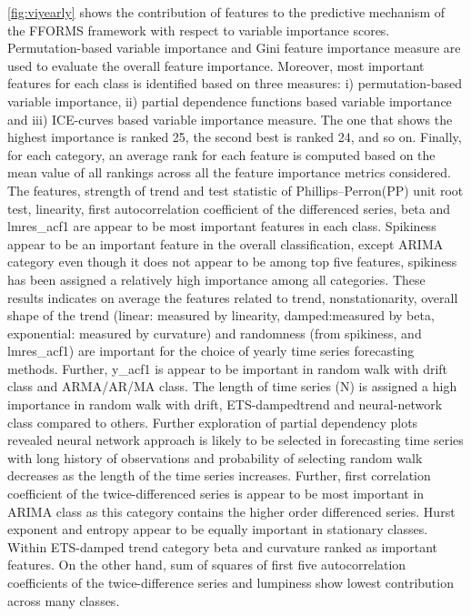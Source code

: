 \documentclass[11pt,a4paper,]{article}
\begin{document}
\autoref{fig:viyearly} shows the contribution of features to the
predictive mechanism of the FFORMS framework with respect to variable
importance scores. Permutation-based variable importance and Gini
feature importance measure are used to evaluate the overall feature
importance. Moreover, most important features for each class is
identified based on three measures: i) permutation-based variable
importance, ii) partial dependence functions based variable importance
and iii) ICE-curves based variable importance measure. The one that
shows the highest importance is ranked 25, the second best is ranked 24,
and so on. Finally, for each category, an average rank for each feature
is computed based on the mean value of all rankings across all the
feature importance metrics considered. The features, strength of trend
and test statistic of Phillips--Perron(PP) unit root test, linearity,
first autocorrelation coefficient of the differenced series, beta and
lmres\_acf1 are appear to be most important features in each class.
Spikiness appear to be an important feature in the overall
classification, except ARIMA category even though it does not appear to
be among top five features, spikiness has been assigned a relatively
high importance among all categories. These results indicates on average
the features related to trend, nonstationarity, overall shape of the
trend (linear: measured by linearity, damped:measured by beta,
exponential: measured by curvature) and randomness (from spikiness, and
lmres\_acf1) are important for the choice of yearly time series
forecasting methods. Further, y\_acf1 is appear to be important in
random walk with drift class and ARMA/AR/MA class. The length of time
series (N) is assigned a high importance in random walk with drift,
ETS-dampedtrend and neural-network class compared to others. Further
exploration of partial dependency plots revealed neural network approach
is likely to be selected in forecasting time series with long history of
observations and probability of selecting random walk decreases as the
length of the time series increases. Further, first correlation
coefficient of the twice-differenced series is appear to be most
important in ARIMA class as this category contains the higher order
differenced series. Hurst exponent and entropy appear to be equally
important in stationary classes. Within ETS-damped trend category beta
and curvature ranked as important features. On the other hand, sum of
squares of first five autocorrelation coefficients of the
twice-difference series and lumpiness show lowest contribution across
many classes.
\end{document}
